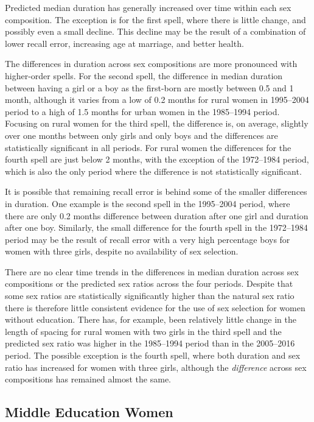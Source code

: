 \documentclass[12pt,letterpaper]{article}
\begin{document}
Predicted median duration has generally increased over time within
each sex composition.
The exception is for the first spell, where there is little
change, and possibly even a small decline.
This decline may be the result of a combination of lower recall
error, increasing age at marriage, and better health.

The differences in duration across sex compositions are more 
pronounced with higher-order spells.
For the second spell, the difference in median duration between
having a girl or a boy as the first-born are mostly between 0.5 and 1 
month, although it varies from a low of 0.2 months for rural women 
in 1995--2004 period to a high of 1.5 months
for urban women in the 1985--1994 period.
Focusing on rural women for the third spell, the difference is,
on average, slightly over one months between only girls and only boys 
and the differences are statistically significant in all periods.
For rural women the differences for the fourth spell are just below
2 months, with the exception of the 1972--1984 period, which is
also the only period where the difference is not statistically significant.

It is possible that remaining recall error is behind some of the
smaller differences in duration.
One example is the second spell in the 1995--2004 period, where there 
are only 0.2 months difference between duration after one girl and 
duration after one boy.
Similarly, the small difference for the fourth spell in the 1972--1984
period may be the result of recall error with a very high 
percentage boys for women with three girls, despite no availability
of sex selection.

There are no clear time trends in the differences in median duration
across sex compositions or the predicted sex ratios across the four periods.
Despite that some sex ratios are statistically significantly higher 
than the natural sex ratio there is therefore little consistent evidence 
for the use of sex selection for women without education.
There has, for example, been relatively little change in the length
of spacing for rural women with two girls in the third spell and 
the predicted sex ratio was higher in the 1985--1994 period
than in the 2005--2016 period.
The possible exception is the fourth spell, where both duration 
and sex ratio has increased for women with three girls, although
the \emph{difference} across sex compositions has remained almost
the same.

\subsection{Middle Education Women}
\end{document}
